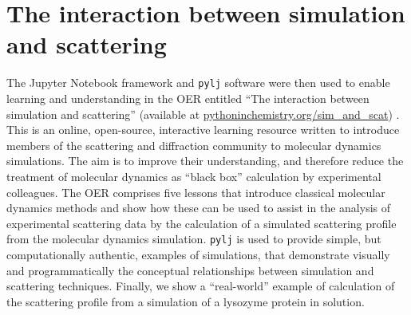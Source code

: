 \section{The interaction between simulation and scattering}
\label{sec:sim_and_scat}
The Jupyter Notebook framework and \texttt{pylj} software were then used to enable learning and understanding in the OER entitled ``The interaction between simulation and scattering'' (available at \href{https://pythoninchemistry.org/sim_and_scat}{pythoninchemistry.org/sim\_and\_scat}) \cite{mccluskey_pythoninchemistry/sim_and_scat_2019}.
This is an online, open-source, interactive learning resource written to introduce members of the scattering and diffraction community to molecular dynamics simulations.
The aim is to improve their understanding, and therefore reduce the treatment of molecular dynamics as ``black box'' calculation by experimental colleagues.
The OER comprises five lessons that introduce classical molecular dynamics methods and show how these can be used to assist in the analysis of experimental scattering data by the calculation of a simulated scattering profile from the molecular dynamics simulation.
\texttt{pylj} is used to provide simple, but computationally authentic, examples of simulations, that demonstrate visually and programmatically the conceptual relationships between simulation and scattering techniques.
Finally, we show a ``real-world'' example of calculation of the scattering profile from a simulation of a lysozyme protein in solution.

